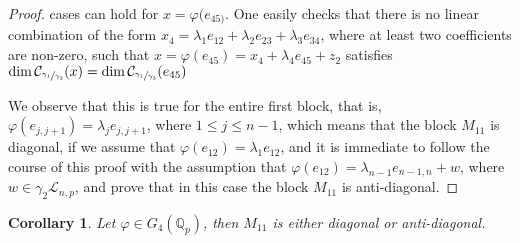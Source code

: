 \documentclass[12pt]{article}
\newtheorem{corollary}[theorem]{Corollary}
\begin{document}
\begin{proof}
cases can hold for $x=\varphi(e_{45)}$. One easily checks that there is no linear combination of the form $x_4=\lambda_1 e_{12}+\lambda_2 e_{23}+\lambda_3 e_{34}$, where at least two coefficients are non-zero, such that $x=\varphi(e_{45})=x_4+\lambda_4 e_{45}+z_2$ satisfies $\dim\mathcal{C}_{\sfrac{\gamma_1}{\gamma_3}}(x)=\dim\mathcal{C}_{\sfrac{\gamma_1}{\gamma_3}}(e_{45})$



We observe that this is true for the entire first block, that is, $\varphi(e_{j,j+1})=\lambda_j e_{j,j+1}$, where $1\leq j\leq n-1$, which means that the block $M_{11}$ is diagonal, if we assume that $\varphi(e_{12})=\lambda_1 e_{12}$, and it is immediate to follow the course of this proof with the assumption that $\varphi(e_{12})=\lambda_{n-1}e_{n-1,n}+w$, where $w\in\gamma_2\mathcal{L}_{n,p}$, and prove that in this case the block $M_{11}$ is anti-diagonal.
\end{proof}
\begin{corollary}
\label{m11.n.4}
Let $\varphi\in G_4(\mathbb{Q}_p)$, then $M_{11}$ is either diagonal or anti-diagonal.
\end{corollary}
\end{document}
